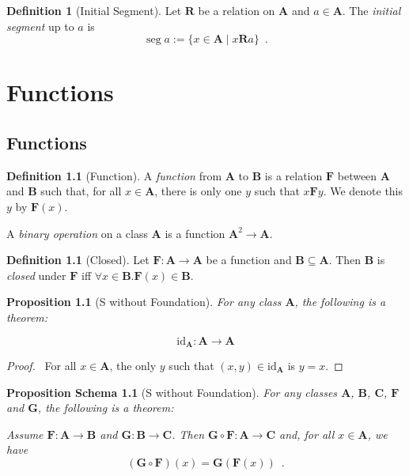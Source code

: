 \documentclass{book}
\let\qed\relax
\newtheorem{prop}[ax]{Proposition}
\newtheorem{props}[ax]{Proposition Schema}
\theoremstyle{definition}
\newtheorem{df}[ax]{Definition}
\newcommand{\seg}{\ensuremath{\operatorname{seg}}}
\begin{document}
\begin{df}[Initial Segment]
Let $\mathbf{R}$ be a relation on $\mathbf{A}$ and $a \in \mathbf{A}$. The \emph{initial segment} up to $a$ is
\[ \seg a := \{ x \in \mathbf{A} \mid x \mathbf{R} a \} \enspace . \]
\end{df}

\chapter{Functions}

\section{Functions}

\begin{df}[Function]
A \emph{function} from $\mathbf{A}$ to $\mathbf{B}$ is a relation $\mathbf{F}$ between $\mathbf{A}$ and $\mathbf{B}$ such that, for all $x \in \mathbf{A}$, there is only one $y$ such that $x \mathbf{F} y$. We denote this $y$ by $\mathbf{F}(x)$.

A \emph{binary operation} on a class $\mathbf{A}$ is a function $\mathbf{A}^2 \rightarrow \mathbf{A}$.
\end{df}

\begin{df}[Closed]
Let $\mathbf{F} : \mathbf{A} \rightarrow \mathbf{A}$ be a function and $\mathbf{B} \subseteq \mathbf{A}$. Then $\mathbf{B}$ is \emph{closed} under $\mathbf{F}$ iff $\forall x \in \mathbf{B}. \mathbf{F}(x) \in \mathbf{B}$.
\end{df}

\begin{prop}[S without Foundation]
For any class $\mathbf{A}$, the following is a theorem:

\[ \mathrm{id}_\mathbf{A} : \mathbf{A} \rightarrow \mathbf{A} \]
\end{prop}

\begin{proof}
\pf\ For all $x \in \mathbf{A}$, the only $y$ such that $(x,y) \in \mathrm{id}_\mathbf{A}$ is $y = x$. \qed
\end{proof}

\begin{props}[S without Foundation]
For any classes $\mathbf{A}$, $\mathbf{B}$, $\mathbf{C}$, $\mathbf{F}$ and $\mathbf{G}$, the following is a theorem:

Assume $\mathbf{F} : \mathbf{A} \rightarrow \mathbf{B}$ and $\mathbf{G} : \mathbf{B} \rightarrow \mathbf{C}$. Then $\mathbf{G} \circ \mathbf{F} : \mathbf{A} \rightarrow \mathbf{C}$ and, for all $x \in \mathbf{A}$, we have
\[ (\mathbf{G} \circ \mathbf{F})(x) = \mathbf{G}(\mathbf{F}(x)) \enspace . \]
\end{props}
\end{document}
